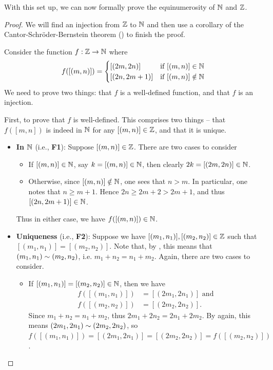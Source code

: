 With this set up, we can now formally prove the equinumerosity of $\mathbb{N}$ and $\mathbb{Z}$.
\begin{proof}
    We will find an injection from $\mathbb{Z}$ to $\mathbb{N}$ and then use a corollary of the Cantor-Schr\"oder-Bernstein theorem () to finish the proof.

    Consider the function $f: \mathbb{Z} \to \mathbb{N}$ where
    \[
        f([(m,n)]) = \begin{cases}
            [(2m,2n)] & \text{if } [(m,n)] \in \mathbb{N}\\
            [(2n,2m+1)] & \text{if } [(m,n)] \notin \mathbb{N}
        \end{cases}
    \]
    We need to prove two things: that $f$ is a well-defined function, and that $f$ is an injection.

    First, to prove that $f$ is well-defined. This comprises two things -- that $f([m,n])$ is indeed in $\mathbb{N}$ for any $[(m,n)] \in \mathbb{Z}$, and that it is unique.
    \begin{itemize}
        \item \textbf{In $\mathbb{N}$} (i.e., \textbf{F1}): Suppose $[(m,n)] \in \mathbb{Z}$. There are two cases to consider
        \begin{itemize}
            \item If $[(m,n)] \in \mathbb{N}$, say $k = [(m,n)] \in \mathbb{N}$, then clearly $2k = [(2m,2n)] \in \mathbb{N}$.
            
            \item Otherwise, since $[(m,n)] \notin \mathbb{N}$, one sees that $n > m$. In particular, one notes that $n \geq m + 1$. Hence $2n \geq 2m + 2 > 2m + 1$, and thus $[(2n, 2m+1)] \in \mathbb{N}$.
        \end{itemize}
        Thus in either case, we have $f([(m,n)]) \in \mathbb{N}$.
        
        \item \textbf{Uniqueness} (i.e., \textbf{F2}): Suppose we have $[(m_1, n_1)], [(m_2, n_2)] \in \mathbb{Z}$ such that $[(m_1, n_1)] = [(m_2, n_2)]$. Note that, by , this means that $(m_1, n_1) \sim (m_2, n_2)$, i.e. $m_1 + n_2 = n_1 + m_2$. Again, there are two cases to consider.
        \begin{itemize}
            \item If $[(m_1, n_1)] = [(m_2, n_2)] \in \mathbb{N}$, then we have
            \begin{align*}
                f([(m_1, n_1)]) &= [(2m_1, 2n_1)] \text{ and}\\
                f([(m_2, n_2)]) &= [(2m_2, 2n_2)].
            \end{align*}
            Since $m_1 + n_2 = n_1 + m_2$, thus $2m_1 + 2n_2 = 2n_1 + 2m_2$. By  again, this means $(2m_1, 2n_1) \sim (2m_2, 2n_2)$, so $f([(m_1, n_1)]) = [(2m_1, 2n_1)] = [(2m_2, 2n_2)] = f([(m_2, n_2)])$.


\end{itemize}
\end{itemize}
\end{proof}
